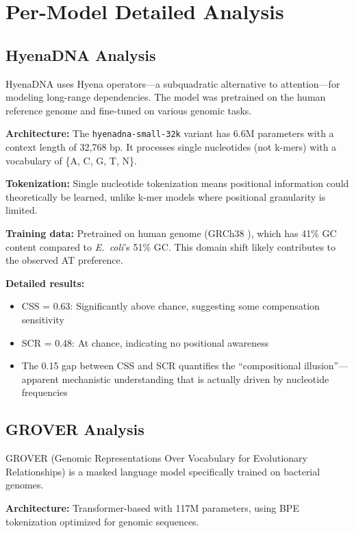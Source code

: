 \documentclass{article}
\begin{document}
\section{Per-Model Detailed Analysis}
\label{app:permodel}

\subsection{HyenaDNA Analysis}

HyenaDNA uses Hyena operators---a subquadratic alternative to attention---for modeling long-range dependencies. The model was pretrained on the human reference genome and fine-tuned on various genomic tasks.

\textbf{Architecture:} The \texttt{hyenadna-small-32k} variant has 6.6M parameters with a context length of 32,768 bp. It processes single nucleotides (not k-mers) with a vocabulary of \{A, C, G, T, N\}.

\textbf{Tokenization:} Single nucleotide tokenization means positional information could theoretically be learned, unlike k-mer models where positional granularity is limited.

\textbf{Training data:} Pretrained on human genome (GRCh38 \citep{schneider2017grch38}), which has 41\% GC content compared to \textit{E.\ coli}'s 51\% GC. This domain shift likely contributes to the observed AT preference.

\textbf{Detailed results:}
\begin{itemize}
\item CSS = 0.63: Significantly above chance, suggesting some compensation sensitivity
\item SCR = 0.48: At chance, indicating no positional awareness
\item The 0.15 gap between CSS and SCR quantifies the ``compositional illusion''---apparent mechanistic understanding that is actually driven by nucleotide frequencies
\end{itemize}

\subsection{GROVER Analysis}

GROVER (Genomic Representations Over Vocabulary for Evolutionary Relationships) is a masked language model specifically trained on bacterial genomes.

\textbf{Architecture:} Transformer-based with 117M parameters, using BPE tokenization optimized for genomic sequences.
\end{document}
